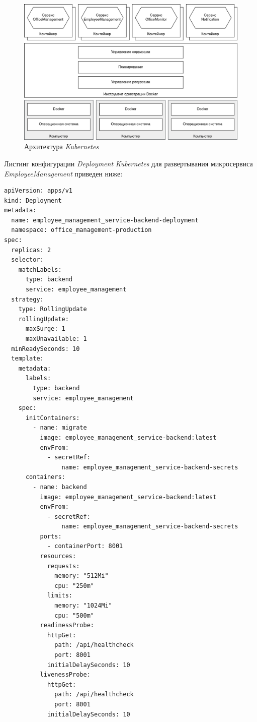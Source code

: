 \begin{figure}[h]
\centering
    \includegraphics[width=0.99\linewidth]{assets/kubernetes-infrastructure.png}
    \caption{Архитектура \textit{Kubernetes}}
    \label{fig:system-design:deployment:kubernetes-infrastructure}
\end{figure}

Листинг конфигурации \textit{Deployment} \textit{Kubernetes} для развертывания микросервиса \textit{EmployeeManagement} приведен ниже:

\begin{lstlisting}[style=pythonstyle]
apiVersion: apps/v1
kind: Deployment
metadata:
  name: employee_management_service-backend-deployment
  namespace: office_management-production
spec:
  replicas: 2
  selector:
    matchLabels:
      type: backend
      service: employee_management
  strategy:
    type: RollingUpdate
    rollingUpdate:
      maxSurge: 1
      maxUnavailable: 1
  minReadySeconds: 10
  template:
    metadata:
      labels:
        type: backend
        service: employee_management
    spec:
      initContainers:
        - name: migrate
          image: employee_management_service-backend:latest
          envFrom:
            - secretRef:
                name: employee_management_service-backend-secrets
      containers:
        - name: backend
          image: employee_management_service-backend:latest
          envFrom:
            - secretRef:
                name: employee_management_service-backend-secrets
          ports:
            - containerPort: 8001
          resources:
            requests:
              memory: "512Mi"
              cpu: "250m"
            limits:
              memory: "1024Mi"
              cpu: "500m"
          readinessProbe:
            httpGet:
              path: /api/healthcheck
              port: 8001
            initialDelaySeconds: 10
          livenessProbe:
            httpGet:
              path: /api/healthcheck
              port: 8001
            initialDelaySeconds: 10
\end{lstlisting}

